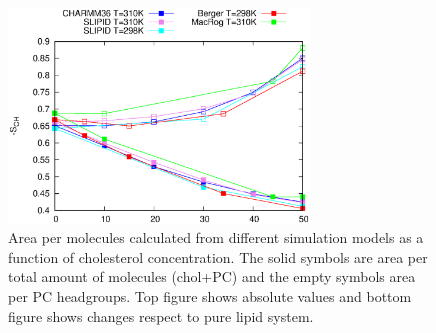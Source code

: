 \documentclass[aps,prl,superscriptaddress,twocolumn]{revtex4}
\begin{document}
\begin{figure}[]
  \centering
  \includegraphics[width=8cm]{../FIGS/apls.eps}
  \caption{\label{apls}
    Area per molecules calculated from different simulation models
    as a function of cholesterol concentration. The solid symbols are area per
    total amount of molecules (chol+PC) and the empty symbols area per PC headgroups.
    Top figure shows absolute values and bottom figure shows changes respect
    to pure lipid system.
  }
\end{figure}
\end{document}
